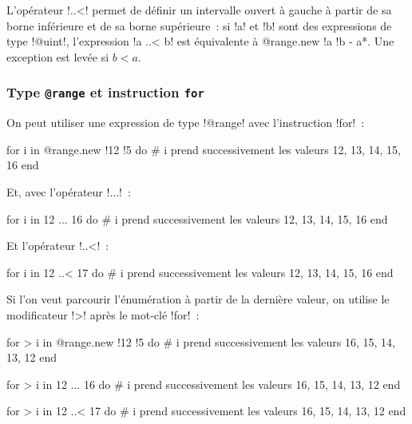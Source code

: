L'opérateur \ggs!..<! permet de définir un intervalle ouvert à gauche à partir de sa borne inférieure et de sa borne supérieure~: si \ggs!a! et \ggs!b! sont des expressions de type \ggs!@uint!, l'expression \ggs!a ..< b! est équivalente à \ggs*@range.new {!a !b - a}*. Une exception est levée si $b < a$.

\subsubsection{Type \texttt{@range} et instruction \texttt{for}}

On peut utiliser une expression de type \ggs!@range! avec l'instruction \ggs!for!~:

\begin{galgas}
for i in @range.new {!12 !5} do
  # i prend successivement les valeurs 12, 13, 14, 15, 16
end
\end{galgas}

Et, avec l'opérateur \ggs!...!~:
\begin{galgas}
for i in 12 ... 16 do
  # i prend successivement les valeurs 12, 13, 14, 15, 16
end
\end{galgas}

Et l'opérateur \ggs!..<!~:
\begin{galgas}
for i in 12 ..< 17 do
  # i prend successivement les valeurs 12, 13, 14, 15, 16
end
\end{galgas}

Si l'on veut parcourir l'énumération à partir de la dernière valeur, on utilise le modificateur \ggs!>! après le mot-clé \ggs!for!~:
\begin{galgas}
for > i in @range.new {!12 !5} do
  # i prend successivement les valeurs 16, 15, 14, 13, 12
end
\end{galgas}
 
\begin{galgas}
for > i in 12 ... 16 do
  # i prend successivement les valeurs 16, 15, 14, 13, 12
end
\end{galgas}
 
\begin{galgas}
for > i in 12 ..< 17 do
  # i prend successivement les valeurs 16, 15, 14, 13, 12
end
\end{galgas}
 

